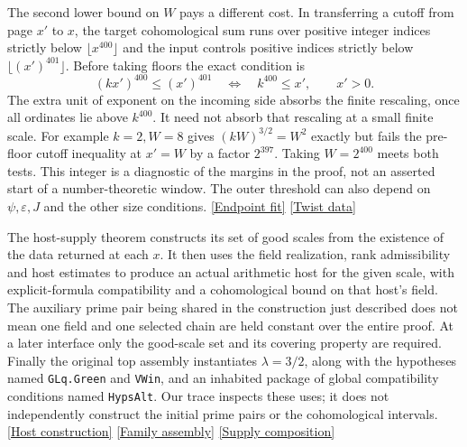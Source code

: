 \documentclass[12pt,letterpaper]{article}
\begin{document}
The second lower bound on \(W\) pays a different cost. In transferring a cutoff from page \(x'\) to \(x\), the target cohomological sum runs over positive integer indices strictly below \(\lfloor x^{400}\rfloor\) and the input controls positive indices strictly below \(\lfloor (x')^{401}\rfloor\). Before taking floors the exact condition is
\begin{equation}
   (kx')^{400}\le(x')^{401}
       \quad\Longleftrightarrow\quad k^{400}\le x',\qquad x'>0.
   \label{eq:arith-cutoff}
\end{equation}
The extra unit of exponent on the incoming side absorbs the finite rescaling, once all ordinates lie above \(k^{400}\). It need not absorb that rescaling at a small finite scale. For example \(k=2,W=8\) gives \((kW)^{3/2}=W^2\) exactly but fails the pre-floor cutoff inequality at \(x'=W\) by a factor \(2^{397}\). Taking \(W=2^{400}\) meets both tests. This integer is a diagnostic of the margins in the proof, not an asserted start of a number-theoretic window. The outer threshold can also depend on \(\psi,\varepsilon,J\) and the other size conditions. \href{https://github.com/nousentllc/riemann-hypothesis/blob/40e56bab026552e089d7afcfeff08d2defb9c005/src/Development/AutomorphicArithmetic/CharacterBoxes/WinPairs.lean#L52-L81}{\textsf{[Endpoint fit]}} \href{https://github.com/nousentllc/riemann-hypothesis/blob/40e56bab026552e089d7afcfeff08d2defb9c005/src/Development/AutomorphicArithmetic/CharacterBoxes/TwistForm.lean#L19-L26}{\textsf{[Twist data]}}

The host-supply theorem constructs its set of good scales from the existence of the data returned at each \(x\). It then uses the field realization, rank admissibility and host estimates to produce an actual arithmetic host for the given scale, with explicit-formula compatibility and a cohomological bound on that host's field. The auxiliary prime pair being shared in the construction just described does not mean one field and one selected chain are held constant over the entire proof. At a later interface only the good-scale set and its covering property are required. Finally the original top assembly instantiates \(\lambda=3/2\), along with the hypotheses named \texttt{GLq.Green} and \texttt{VWin}, and an inhabited package of global compatibility conditions named \texttt{HypsAlt}. Our trace inspects these uses; it does not independently construct the initial prime pairs or the cohomological intervals. \href{https://github.com/nousentllc/riemann-hypothesis/blob/40e56bab026552e089d7afcfeff08d2defb9c005/src/Development/AutomorphicArithmetic/ShortNorms/supplyOfAdmOf.lean#L49-L58}{\textsf{[Host construction]}} \href{https://github.com/nousentllc/riemann-hypothesis/blob/40e56bab026552e089d7afcfeff08d2defb9c005/src/Development/AutomorphicArithmetic/ShortNorms/supplyOfAdmOf.lean#L110-L135}{\textsf{[Family assembly]}} \href{https://github.com/nousentllc/riemann-hypothesis/blob/40e56bab026552e089d7afcfeff08d2defb9c005/src/Development/AutomorphicArithmetic/ThetaCorrespondence/ThetaPairLifts/ThirdPlaceSeries/TopPlug.lean#L12-L18}{\textsf{[Supply composition]}}
\end{document}
